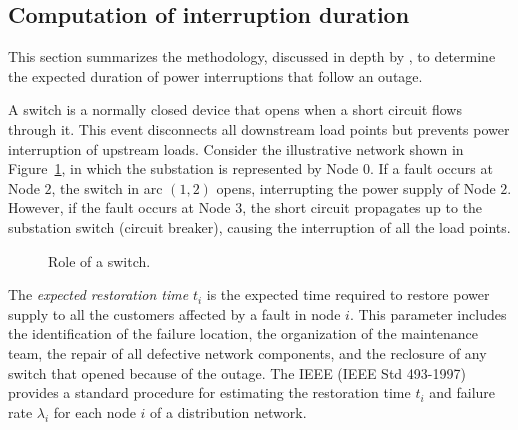 \documentclass{article}
\begin{document}
\subsection{Computation of interruption duration}  \label{sec:Interruption}

This section summarizes the methodology, discussed in depth by \cite{billinton}, to determine the expected duration of power interruptions that follow an outage. 

A switch is a  normally closed device that opens when a short circuit flows through it. This event disconnects all downstream load points but prevents power interruption of  upstream loads. Consider the illustrative network shown in Figure~\ref{fig:example}, in which the substation is represented by Node $0$. If a fault occurs at Node $2$, the switch in arc $(1,2)$ opens, interrupting the power supply of Node $2$. However, if the fault occurs at Node $3$, the short circuit propagates up to the substation switch (circuit breaker), causing the interruption of all the load points.

\begin{figure}[hbtp]
\begin{center}
	\end{center}
	\vspace{-0.5cm}
\caption{Role of a switch.}
\label{fig:example}
\end{figure}

The \textit{expected restoration time} $t_i$ is the expected time required to restore power supply to all the customers affected by a fault in node $i$.
This parameter includes the identification of the failure location, the organization of the maintenance team, the repair of all defective network components, and the reclosure of any switch that opened because of the outage. The IEEE \cite{goldbook} (IEEE Std 493-1997) provides a standard procedure for estimating the restoration time $t_i$ and failure rate $\lambda_i$ for each node $i$ of a distribution network.
\end{document}
